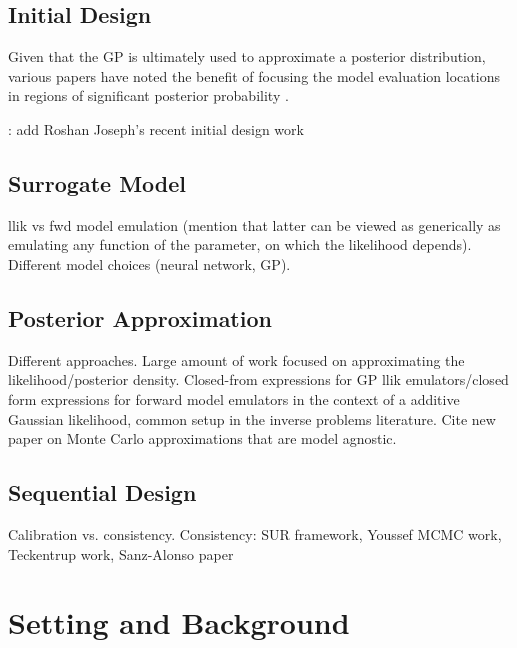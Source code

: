 \documentclass[12pt]{article}
\begin{document}
\subsection{Initial Design}


Given that the GP is ultimately used to approximate a posterior distribution, various papers have noted the benefit of 
focusing the model evaluation locations in regions of significant posterior probability 
\citep{CES,idealizedGCM}.

\todo: add Roshan Joseph's recent initial design work

\subsection{Surrogate Model}
llik vs fwd model emulation (mention that latter can be viewed as generically as emulating any function of the parameter, on 
which the likelihood depends). Different model choices (neural network, GP). 

\subsection{Posterior Approximation}
Different approaches. Large amount of work focused on approximating the likelihood/posterior density. Closed-from expressions for 
GP llik emulators/closed form expressions for forward model emulators in the context of a additive Gaussian likelihood, common setup
in the inverse problems literature. Cite new paper on Monte Carlo approximations that are model agnostic.

\subsection{Sequential Design}
Calibration vs. consistency. Consistency: SUR framework, Youssef MCMC work, Teckentrup work, Sanz-Alonso paper

\section{Setting and Background}
\end{document}
